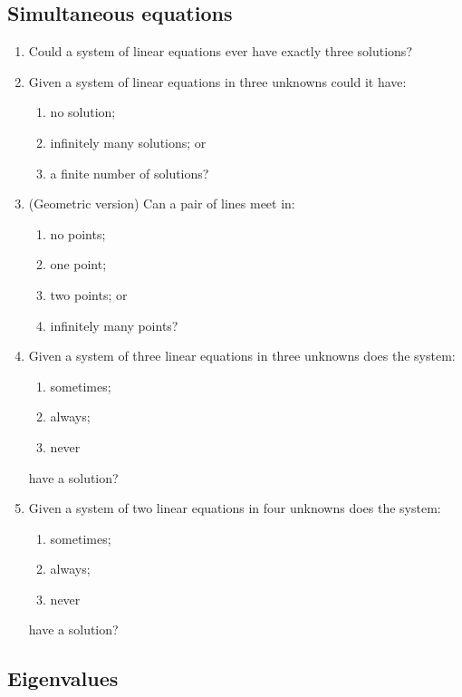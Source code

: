 \documentclass[12pt]{article}
\begin{document}
\subsection*{Simultaneous equations}
\begin{enumerate}
\item Could a system of linear equations ever have exactly three solutions?

\bigskip

\item Given a system of linear equations in three unknowns could it have:
\begin{enumerate}
\item no solution;
\item infinitely many solutions; or
\item a finite number of solutions?
\end{enumerate}

\bigskip

\item (Geometric version) Can a pair of lines meet in: 
\begin{enumerate}
\item no points;
\item one point;
\item two points; or
\item infinitely many points?
\end{enumerate}

\bigskip

\item Given a system of three linear equations in three unknowns does the system:
\begin{enumerate}
\item sometimes;
\item always;
\item never
\end{enumerate}
have a solution?

\bigskip

\item Given a system of two linear equations in four unknowns does the system:
\begin{enumerate}
\item sometimes;
\item always;
\item never
\end{enumerate}
have a solution?
\end{enumerate}

\pagebreak
\subsection*{Eigenvalues}
\end{document}
